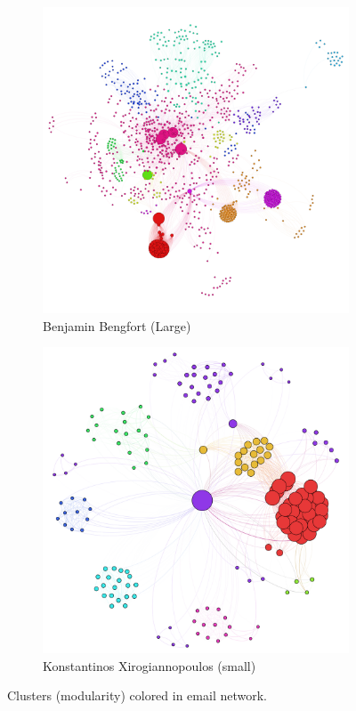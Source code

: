 \documentclass[11pt,letterpaper]{article}
\begin{document}
\begin{figure}[h]
	\centering
	\begin{subfigure}{0.49\textwidth}
		\centering
		\includegraphics[width=\textwidth]{figures/benjamin_cluster.png}
		\caption{\textsf{Benjamin Bengfort (Large)}}
        \label{fig:benjamin_cluster}
	\end{subfigure} \hfill
	\begin{subfigure}{0.49\textwidth}
		\centering
		\includegraphics[width=\textwidth]{figures/kostas_cluster.png}
		\caption{\textsf{Konstantinos Xirogiannopoulos (small)}}
        \label{fig:kostas_cluster}
	\end{subfigure}
    \caption{\textsf{Clusters (modularity) colored in email network.}}
    \label{fig:cluster}
\end{figure}
\end{document}
